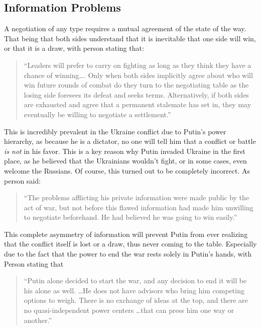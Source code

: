 \documentclass{article}
\begin{document}
    \subsection{Information Problems}
        A negotiation of any type requires a mutual agreement of the state of the way. That being that both sides understand that it is inevitable that one side will win, or that it is a draw, with person stating that:

        \begin{quote} 
            ``Leaders will prefer to carry on fighting as long as they think they have a chance of winning\ldots. Only when both sides implicitly agree about who will win future rounds of combat do they turn to the negotiating table as the losing side foresees its defeat and seeks terms. Alternatively, if both sides are exhausted and agree that a permanent stalemate has set in, they may eventually be willing to negotiate a settlement.''
        \end{quote}

        This is incredibly prevalent in the Ukraine conflict due to Putin's power hierarchy, as because he is a dictator, no one will tell him that a conflict or battle \textit{is not} in his favor. This is a key reason why Putin invaded Ukraine in the first place, as he believed that the Ukrainians wouldn't fight, or in some cases, even welcome the Russians. Of course, this turned out to be completely incorrect. As person said: 
        
        \begin{quote}
            ``The problems afflicting his private information were made public by the act of war, but not before this flawed information had made him unwilling to negotiate beforehand. He had believed he was going to win easily.''
        \end{quote}
        
        This complete asymmetry of information will prevent Putin from ever realizing that the conflict itself is lost or a draw, thus never coming to the table. Especially due to the fact that the power to end the war rests solely in Putin's hands, with Person stating that 

        \begin{quote}
           ``Putin alone decided to start the war, and any decision to end it will be his alone as well. \ldots He does not have advisors who bring him competing options to weigh. There is no exchange of ideas at the top, and there are no quasi-independent power centers \ldots that can press him one way or another.''
        \end{quote}
    
\end{document}
